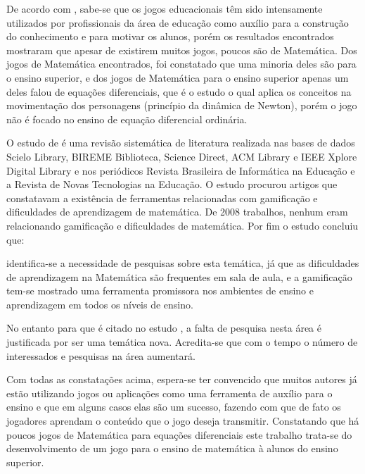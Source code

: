 De acordo com \cite{Nunes}, sabe-se que os jogos educacionais têm sido intensamente utilizados por profissionais da área de educação como auxílio para a construção do conhecimento e para motivar os alunos, porém os resultados encontrados mostraram que apesar de existirem muitos jogos, poucos são de Matemática. Dos jogos de Matemática encontrados, foi constatado que uma minoria deles são para o ensino superior, e dos jogos de Matemática para o ensino superior apenas um deles falou de equações diferenciais, que é o estudo \cite{videoGameED} o qual aplica os conceitos na movimentação dos personagens (princípio da dinâmica de Newton), porém o jogo não é focado no ensino de equação diferencial ordinária.

O estudo de \cite{revbibmatgam} é uma revisão sistemática de literatura realizada nas bases de dados Scielo Library, BIREME Biblioteca, Science Direct, ACM Library e IEEE Xplore Digital Library e nos periódicos Revista Brasileira de Informática na Educação e a Revista de Novas Tecnologias na Educação. O estudo procurou artigos que constatavam a existência de ferramentas relacionadas com gamificação e dificuldades de aprendizagem de matemática. De 2008 trabalhos, nenhum eram relacionando gamificação e dificuldades de matemática. Por fim o estudo concluiu que:

\begin{citacao}
identifica-se a necessidade de pesquisas sobre esta temática, já que as dificuldades de aprendizagem na Matemática são frequentes em sala de aula, e a gamificação tem-se mostrado uma ferramenta promissora nos ambientes de ensino e aprendizagem em todos os níveis de ensino. 
\end{citacao}

No entanto para \cite{dicheva} que é citado no estudo \cite{revbibmatgam}, a falta de pesquisa nesta área é justificada por ser uma temática nova. Acredita-se que com o tempo o número de interessados e pesquisas na área aumentará.

Com todas as constatações acima, espera-se ter convencido que muitos autores já estão utilizando jogos ou aplicações como uma ferramenta de auxílio para o ensino e que em alguns casos elas são um sucesso, fazendo com que de fato os jogadores aprendam o conteúdo que o jogo deseja transmitir. Constatando que há poucos jogos de Matemática para equações diferenciais este trabalho trata-se do desenvolvimento de um jogo para o ensino de matemática à alunos do ensino superior.
